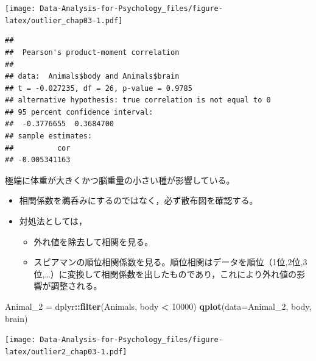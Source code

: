 \documentclass[]{article}
\newenvironment{Shaded}{\begin{snugshade}}{\end{snugshade}}
\newcommand{\KeywordTok}[1]{\textcolor[rgb]{0.13,0.29,0.53}{\textbf{#1}}}
\newcommand{\DataTypeTok}[1]{\textcolor[rgb]{0.13,0.29,0.53}{#1}}
\newcommand{\DecValTok}[1]{\textcolor[rgb]{0.00,0.00,0.81}{#1}}
\newcommand{\StringTok}[1]{\textcolor[rgb]{0.31,0.60,0.02}{#1}}
\newcommand{\CommentTok}[1]{\textcolor[rgb]{0.56,0.35,0.01}{\textit{#1}}}
\newcommand{\OperatorTok}[1]{\textcolor[rgb]{0.81,0.36,0.00}{\textbf{#1}}}
\newcommand{\NormalTok}[1]{#1}
\providecommand{\tightlist}{%
  \setlength{\itemsep}{0pt}\setlength{\parskip}{0pt}}
\begin{document}
\texttt{[image: Data-Analysis-for-Psychology\_files/figure-latex/outlier\_chap03-1.pdf]}

\begin{Shaded}
\end{Shaded}

\begin{verbatim}
## 
##  Pearson's product-moment correlation
## 
## data:  Animals$body and Animals$brain
## t = -0.027235, df = 26, p-value = 0.9785
## alternative hypothesis: true correlation is not equal to 0
## 95 percent confidence interval:
##  -0.3776655  0.3684700
## sample estimates:
##          cor 
## -0.005341163
\end{verbatim}

極端に体重が大きくかつ脳重量の小さい種が影響している。

\begin{itemize}
\tightlist
\item
  相関係数を鵜呑みにするのではなく，必ず散布図を確認する。
\item
  対処法としては，

  \begin{itemize}
  \tightlist
  \item
    外れ値を除去して相関を見る。
  \item
    スピアマンの順位相関係数を見る。順位相関はデータを順位（1位,2位,3位,\ldots{}）に変換して相関係数を出したものであり，これにより外れ値の影響が調整される。
  \end{itemize}
\end{itemize}

\begin{Shaded}
\begin{Highlighting}[]
\NormalTok{Animal_}\DecValTok{2}\NormalTok{ =}\StringTok{ }\NormalTok{dplyr}\OperatorTok{::}\KeywordTok{filter}\NormalTok{(Animals, body }\OperatorTok{<}\StringTok{ }\DecValTok{10000}\NormalTok{)}
\KeywordTok{qplot}\NormalTok{(}\DataTypeTok{data=}\NormalTok{Animal_}\DecValTok{2}\NormalTok{, body, brain)}
\end{Highlighting}
\end{Shaded}

\texttt{[image: Data-Analysis-for-Psychology\_files/figure-latex/outlier2\_chap03-1.pdf]}
\end{document}
